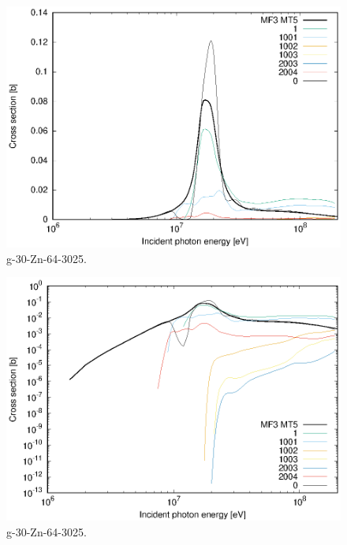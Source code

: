 \begin{figure}
 \includegraphics[width=\linewidth]{eps/g_30-Zn-64_3025.eps}
  \caption{g-30-Zn-64-3025.}
\end{figure}
\begin{figure}
 \includegraphics[width=\linewidth]{eps-log/g_30-Zn-64_3025.eps}
 \caption{g-30-Zn-64-3025.}
\end{figure}
\newpage \clearpage

